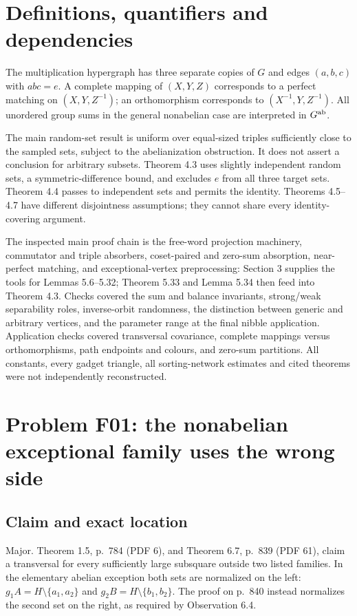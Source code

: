 \documentclass[10pt]{article}
\begin{document}
\section*{Definitions, quantifiers and dependencies}
The multiplication hypergraph has three separate copies of \(G\) and edges \((a,b,c)\) with \(abc=e\). A complete mapping of \((X,Y,Z)\) corresponds to a perfect matching on \((X,Y,Z^{-1})\); an orthomorphism corresponds to \((X^{-1},Y,Z^{-1})\). All unordered group sums in the general nonabelian case are interpreted in \(G^{\rm ab}\).\par
The main random-set result is uniform over equal-sized triples sufficiently close to the sampled sets, subject to the abelianization obstruction. It does not assert a conclusion for arbitrary subsets. Theorem 4.3 uses slightly independent random sets, a symmetric-difference bound, and excludes \(e\) from all three target sets. Theorem 4.4 passes to independent sets and permits the identity. Theorems 4.5–4.7 have different disjointness assumptions; they cannot share every identity-covering argument.\par
The inspected main proof chain is the free-word projection machinery, commutator and triple absorbers, coset-paired and zero-sum absorption, near-perfect matching, and exceptional-vertex preprocessing: Section 3 supplies the tools for Lemmas 5.6–5.32; Theorem 5.33 and Lemma 5.34 then feed into Theorem 4.3. Checks covered the sum and balance invariants, strong/weak separability roles, inverse-orbit randomness, the distinction between generic and arbitrary vertices, and the parameter range at the final nibble application. Application checks covered transversal covariance, complete mappings versus orthomorphisms, path endpoints and colours, and zero-sum partitions. All constants, every gadget triangle, all sorting-network estimates and cited theorems were not independently reconstructed.\par
\section*{Problem F01: the nonabelian exceptional family uses the wrong side}
\subsection*{Claim and exact location}
Major. Theorem 1.5, p. 784 (PDF 6), and Theorem 6.7, p. 839 (PDF 61), claim a transversal for every sufficiently large subsquare outside two listed families. In the elementary abelian exception both sets are normalized on the left: \(g_1A=H\setminus\{a_1,a_2\}\) and \(g_2B=H\setminus\{b_1,b_2\}\). The proof on p. 840 instead normalizes the second set on the right, as required by Observation 6.4.\par
\end{document}
